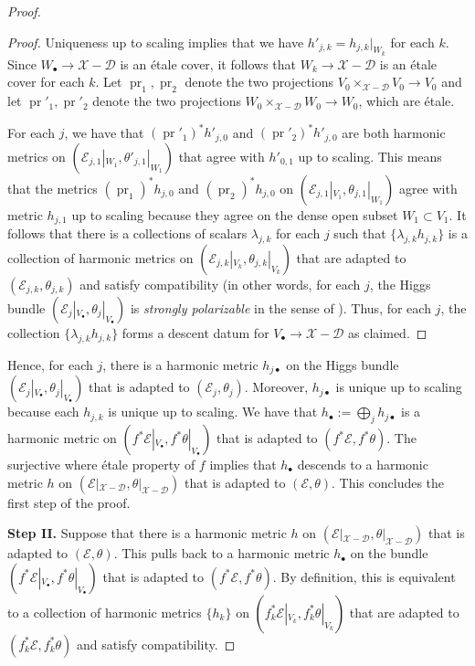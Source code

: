 \documentclass[a4paper]{amsart}
\theoremstyle{definition}
\def\pr{\mathop{\mathrm{pr}}\nolimits}
\begin{document}
\begin{proof}
\begin{proof}
Uniqueness up to scaling implies that we have $h'_{j,k}=h_{j,k}|_{W_k}$ for each $k$. Since $W_\bullet\to\mathscr{X}-\mathscr{D}$ is an \'etale cover, it follows that $W_k\to\mathscr{X}-\mathscr{D}$ is an \'etale cover for each $k$. Let $\pr_1,\pr_2$ denote the two projections $V_0\times_{\mathscr{X}-\mathscr{D}}V_0\to V_0$ and let $\pr'_1,\pr'_2$ denote the two projections $W_0\times_{\mathscr{X}-\mathscr{D}}W_0\to W_0$, which are \'etale. 

For each $j$, we have that $(\pr'_1)^*h'_{j,0}$ and $(\pr'_2)^*h'_{j,0}$ are both harmonic metrics on $(\mathcal{E}_{j,1}|_{W_1},\theta'_{j,1}|_{W_1})$ that agree with $h'_{0,1}$ up to scaling. This means that the metrics $(\pr_1)^*h_{j,0}$ and $(\pr_2)^*h_{j,0}$ on $(\mathcal{E}_{j,1}|_{V_1},\theta_{j,1}|_{W_1})$ agree with metric $h_{j,1}$ up to scaling because they agree on the dense open subset $W_1\subset V_1$. It follows that there is a collections of scalars $\lambda_{j,k}$ for each $j$ such that $\{\lambda_{j,k}h_{j,k}\}$ is a collection of harmonic metrics on $(\mathcal{E}_{j,k}|_{V_k},\theta_{j,k}|_{V_k})$ that are adapted to $(\mathcal{E}_{j,k},\theta_{j,k})$ and satisfy compatibility (in other words, for each $j$, the Higgs bundle $(\mathcal{E}_j|_{V_\bullet},\theta_j|_{V_\bullet})$ is \emph{strongly polarizable} in the sense of \cite[Section 7]{simpsonstacks}). Thus, for each $j$, the collection $\{\lambda_{j,k}h_{j,k}\}$ forms a descent datum for $V_\bullet\to\mathscr{X}-\mathscr{D}$ as claimed.   
\end{proof}
Hence, for each $j$, there is a harmonic metric $h_{j\bullet}$ on the Higgs bundle $(\mathcal{E}_j|_{V_\bullet},\theta_j|_{V_\bullet})$ that is adapted to $(\mathcal{E}_j,\theta_j)$. Moreover, $h_{j\bullet}$ is unique up to scaling because each $h_{j,k}$ is unique up to scaling. We have that $h_\bullet:=\bigoplus_jh_{j\bullet}$ is a harmonic metric on $(f^*\mathcal{E}|_{V_\bullet},f^*\theta|_{V_\bullet})$ that is adapted to $(f^*\mathcal{E},f^*\theta)$. The surjective where \'etale property of $f$ implies that $h_\bullet$ descends to a harmonic metric $h$ on $(\mathcal{E}|_{\mathscr{X}-\mathscr{D}},\theta|_{\mathscr{X}-\mathscr{D}})$ that is adapted to $(\mathcal{E},\theta)$. This concludes the first step of the proof. 

\textbf{Step II.} Suppose that there is a harmonic metric $h$ on $(\mathcal{E}|_{\mathscr{X}-\mathscr{D}},\theta|_{\mathscr{X}-\mathscr{D}})$ that is adapted to $(\mathcal{E},\theta)$. This pulls back to a harmonic metric $h_\bullet$ on the bundle $(f^*\mathcal{E}|_{V_\bullet},f^*\theta|_{V_\bullet})$ that is adapted to $(f^*\mathcal{E},f^*\theta)$. By definition, this is equivalent to a collection of harmonic metrics $\{h_k\}$ on $(f_k^*\mathcal{E}|_{V_k},f_k^*\theta|_{V_k})$ that are adapted to $(f_k^*\mathcal{E},f_k^*\theta)$ and satisfy compatibility.


\end{proof}
\end{document}
